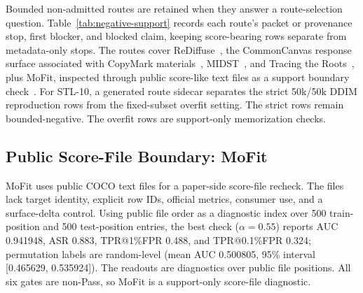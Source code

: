 \documentclass[10pt,conference]{IEEEtran}
\begin{document}
Bounded non-admitted routes are retained when they answer a route-selection
question. Table~\ref{tab:negative-support} records each route's packet or
provenance stop, first blocker, and blocked claim, keeping score-bearing rows
separate from metadata-only stops. The routes cover ReDiffuse~\cite{rediffuse2025}, the CommonCanvas response
surface associated with CopyMark materials~\cite{liang2024copymark}, MIDST~\cite{midst2026challenge}, and Tracing
the Roots~\cite{tracingroots2025}, plus MoFit, inspected through public
score-like text files as a support boundary check~\cite{jeon2026mofit}.
For STL-10, a generated route sidecar separates the strict 50k/50k
DDIM reproduction rows from the fixed-subset overfit setting. The strict rows
remain bounded-negative. The overfit rows are support-only memorization checks.

\subsection{Public Score-File Boundary: MoFit}

MoFit uses public COCO text files for a paper-side score-file recheck. The
files lack target identity, explicit row IDs, official metrics, consumer use,
and a surface-delta control.
Using public file order as a diagnostic index over 500 train-position and 500
test-position entries, the best check
($\alpha=0.55$) reports AUC 0.941948, ASR 0.883, TPR@1\%FPR 0.488, and
TPR@0.1\%FPR 0.324; permutation labels are random-level (mean AUC 0.500805,
95\% interval [0.465629, 0.535924]). The readouts are diagnostics over public
file positions. All six gates are non-Pass, so MoFit is a support-only
score-file diagnostic.
\end{document}
